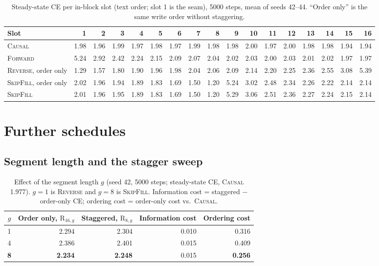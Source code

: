 \documentclass{article}
\theoremstyle{definition}
\theoremstyle{remark}
\newcommand{\name}[1]{\textup{\textsc{#1}}}
\newcommand{\sfill}{\name{SkipFill}\xspace}
\newcommand{\rev}{\name{Reverse}\xspace}
\newcommand{\fwd}{\name{Forward}\xspace}
\newcommand{\causal}{\name{Causal}\xspace}
\newcommand{\Rsg}[2]{\mathrm{R}_{#1,#2}}
\begin{document}
\begin{table}[h]
  \centering
  \caption{Steady-state CE per in-block slot (text order; slot 1 is the seam), 5000 steps, mean of seeds 42--44. ``Order only'' is the same write order without staggering.}
  \label{tab:slots}
  \scriptsize
  \setlength{\tabcolsep}{2.0pt}
  \begin{tabular}{l*{16}{r}}
    \toprule
    Slot & 1 & 2 & 3 & 4 & 5 & 6 & 7 & 8 & 9 & 10 & 11 & 12 & 13 & 14 & 15 & 16 \\
    \midrule
    \causal               & 1.98 & 1.96 & 1.99 & 1.97 & 1.98 & 1.97 & 1.99 & 1.98 & 1.98 & 2.00 & 1.97 & 2.00 & 1.98 & 1.98 & 1.94 & 1.94 \\
    \fwd                  & 5.24 & 2.92 & 2.42 & 2.24 & 2.15 & 2.09 & 2.07 & 2.04 & 2.02 & 2.03 & 2.00 & 2.03 & 2.01 & 2.02 & 1.97 & 1.97 \\
    \rev, order only      & 1.29 & 1.57 & 1.80 & 1.90 & 1.96 & 1.98 & 2.04 & 2.06 & 2.09 & 2.14 & 2.20 & 2.25 & 2.36 & 2.55 & 3.08 & 5.39 \\
    \sfill, order only    & 2.02 & 1.96 & 1.94 & 1.89 & 1.83 & 1.69 & 1.50 & 1.20 & 5.24 & 3.02 & 2.48 & 2.34 & 2.26 & 2.22 & 2.14 & 2.14 \\
    \sfill                & 2.01 & 1.96 & 1.95 & 1.89 & 1.83 & 1.69 & 1.50 & 1.20 & 5.29 & 3.06 & 2.51 & 2.36 & 2.27 & 2.24 & 2.15 & 2.14 \\
    \bottomrule
  \end{tabular}
\end{table}

\section{Further schedules}
\label{app:schedules}

\subsection{Segment length and the stagger sweep}
\label{app:sweep}

\begin{table}[t]
  \centering
  \caption{Effect of the segment length $g$ (seed 42, 5000 steps; steady-state CE, \causal 1.977). $g=1$ is \rev and $g=8$ is \sfill. Information cost = staggered $-$ order-only CE; ordering cost = order-only cost vs.\ \causal.}
  \label{tab:segment}
  \small
  \begin{tabular}{crrrr}
    \toprule
    $g$ & Order only, $\Rsg{16}{g}$ & Staggered, $\Rsg{8}{g}$ & Information cost & Ordering cost \\
    \midrule
    1 & 2.294 & 2.304 & 0.010 & 0.316 \\
    4 & 2.386 & 2.401 & 0.015 & 0.409 \\
    \textbf{8} & \textbf{2.234} & \textbf{2.248} & 0.015 & \textbf{0.256} \\
    \bottomrule
  \end{tabular}
\end{table}
\end{document}
